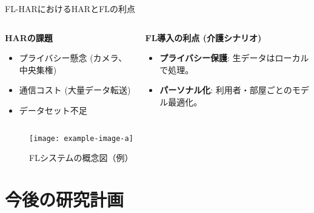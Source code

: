 \documentclass[unicode,12pt,aspectratio=169, dvipdfmx]{beamer}
\begin{document}
\begin{frame}{FL-HARにおけるHARとFLの利点}
\begin{columns}
    \begin{column}{0.5\textwidth}
        \textbf{HARの課題}
        \begin{itemize}
            \item プライバシー懸念 (カメラ、中央集権)
            \item 通信コスト (大量データ転送)
            \item データセット不足
        \end{itemize}
    \end{column}
    \begin{column}{0.5\textwidth}
        \textbf{FL導入の利点 (介護シナリオ)}
        \begin{itemize}
            \item \textbf{プライバシー保護}: 生データはローカルで処理。
            \item \textbf{パーソナル化}: 利用者・部屋ごとのモデル最適化。
        \end{itemize}
    \end{column}
\end{columns}
\vspace{0.5cm}
\begin{figure}[h]
    \centering
    \texttt{[image: example-image-a]} %
    \caption{FLシステムの概念図（例）}
\end{figure}
\end{frame}

\section{今後の研究計画}
\end{document}
